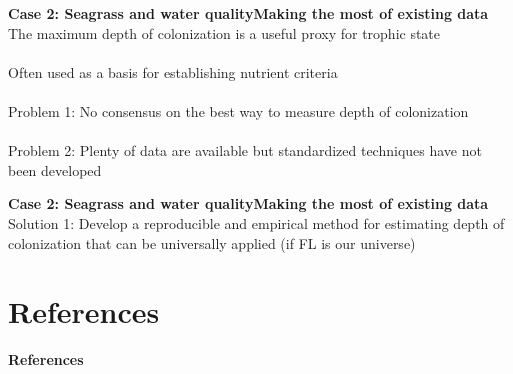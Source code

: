 \documentclass[serif]{beamer}\usepackage[]{graphicx}\usepackage[]{color}
\begin{document}
\begin{frame}{\textbf{Case 2: Seagrass and water quality}}{\textbf{Making the most of existing data}}
\onslide<+->
The maximum depth of colonization is a useful proxy for trophic state \\~\\
Often used as a basis for establishing nutrient criteria \\~\\
\onslide<+->
\alert{Problem 1:} No consensus on the best way to measure depth of colonization\\~\\
\alert{Problem 2:} Plenty of data are available but standardized techniques have not been developed
\onslide<+->
\end{frame}

\begin{frame}{\textbf{Case 2: Seagrass and water quality}}{\textbf{Making the most of existing data}}
\onslide<+->
\alert{Solution 1:} Develop a reproducible and empirical method for estimating depth of colonization that can be universally applied (if FL is our universe)
\end{frame}

\section{References}
\begin{frame}[allowframebreaks]{\textbf{References}}
\tiny
{}


\end{frame}
\end{document}

